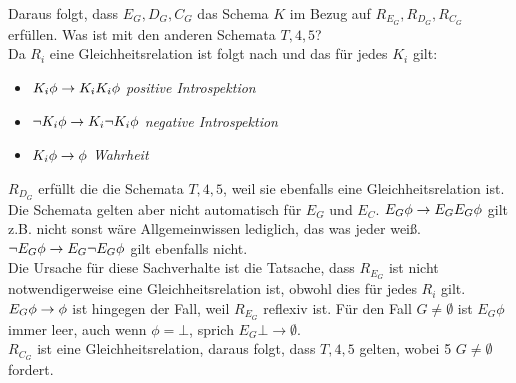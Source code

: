 Daraus folgt, dass $E_G, D_G, C_G$ das Schema $K$ im Bezug auf $R_{E_G}, R_{D_G}, R_{C_G}$ erfüllen.
Was ist mit den anderen Schemata $T,4,5$?\\
Da $R_i$ eine Gleichheitsrelation ist folgt nach  und   das für jedes $K_i$ gilt:
\begin{itemize}
	\item $K_i \phi \rightarrow K_i K_i \phi$ \emph{positive Introspektion}
	\item $\neg K_i \phi \rightarrow K_i \neg K_i \phi$ \emph{negative Introspektion}
	\item $K_i \phi \rightarrow \phi$ \emph{Wahrheit}
\end{itemize}

$R_{D_G}$ erfüllt die die Schemata $T,4,5$, weil sie ebenfalls eine Gleichheitsrelation ist.
Die Schemata gelten aber nicht automatisch für $E_G$ und $E_C$.
$E_G \phi \rightarrow E_G E_G \phi$ gilt z.B. nicht sonst wäre Allgemeinwissen lediglich, das was jeder weiß.
$\neg E_G \phi \rightarrow E_G \neg E_G \phi$ gilt ebenfalls nicht.\\
Die Ursache für diese Sachverhalte ist die Tatsache, dass $R_{E_G}$ ist nicht notwendigerweise eine Gleichheitsrelation ist, obwohl dies für jedes $R_i$ gilt.\\
$E_G \phi \rightarrow \phi$ ist hingegen der Fall, weil $R_{E_G}$ reflexiv ist.
Für den Fall $G \neq \emptyset$ ist $E_G \phi$ immer leer, auch wenn $\phi = \bot$, sprich $E_G \bot \rightarrow \emptyset$. \\
$R_{C_{G}}$ ist eine Gleichheitsrelation, daraus folgt, dass $T,4,5$ gelten, wobei 5 $G \neq \emptyset$ fordert.





